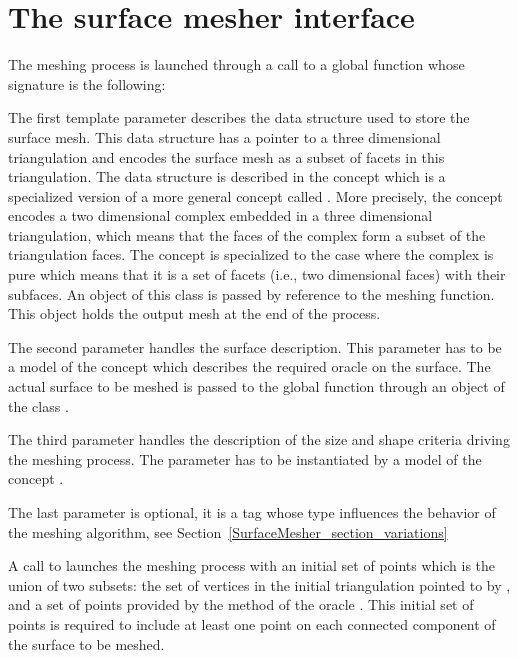 \section{The surface mesher interface}
\label{SurfaceMesher_section_interface}

The meshing process is launched through a call to a global function
whose signature is the following:


The first template parameter  describes 
the data structure
used to store  the surface mesh. This data structure
has a pointer to a three dimensional triangulation and encodes
the surface mesh as a subset of facets in this triangulation.
The data structure is described in the concept
 which is a specialized version
of a more general concept called  .
More precisely, the concept 
encodes a two dimensional complex embedded  in a three dimensional
triangulation, which means that the faces of the complex form a subset
of the triangulation faces. The concept  is 
specialized to the case where the complex is pure which means that it
is a set of facets (i.e., two dimensional faces) with  their subfaces.
An object of this class is passed by reference to the meshing
function. This object holds the output mesh at the end of the
process.

The second parameter  handles the surface
description. This parameter  has to be a model of
the concept  which describes the
required oracle on the surface. The actual surface to be meshed is
passed  to the global function through an object of the class .

The third parameter handles the description of the size and shape
criteria driving the meshing process. The parameter 
has to be instantiated by a model of the concept .


The last parameter is optional, it is a tag 
whose type influences the behavior of the
meshing algorithm, see Section~\ref{SurfaceMesher_section_variations}

A call to 
 launches 
the meshing process with an initial 
set of points which is the union of two subsets:
the set of vertices in the  initial triangulation pointed to by ,
and a set of points provided by the  method 
of the oracle . This initial set of points is required 
to include at least one point on each connected component of the surface
to be meshed.


